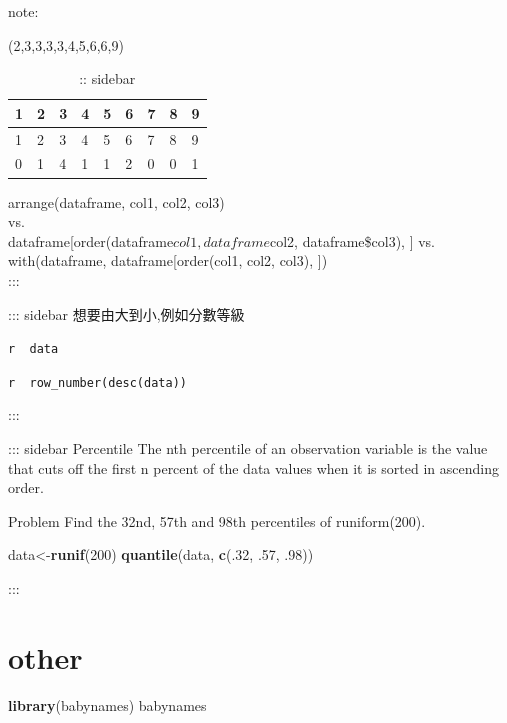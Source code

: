 \documentclass[]{book}
\newenvironment{Shaded}{\begin{snugshade}}{\end{snugshade}}
\newcommand{\KeywordTok}[1]{\textcolor[rgb]{0.13,0.29,0.53}{\textbf{#1}}}
\newcommand{\DecValTok}[1]{\textcolor[rgb]{0.00,0.00,0.81}{#1}}
\newcommand{\NormalTok}[1]{#1}
\theoremstyle{definition}
\theoremstyle{definition}
\theoremstyle{definition}
\theoremstyle{remark}
\begin{document}
note:

(2,3,3,3,3,4,5,6,6,9)

\begin{longtable}[]{@{}lllllllll@{}}
\caption{:: sidebar}\tabularnewline
\toprule
1 & 2 & 3 & 4 & 5 & 6 & 7 & 8 & 9\tabularnewline
\midrule
\endfirsthead
\toprule
1 & 2 & 3 & 4 & 5 & 6 & 7 & 8 & 9\tabularnewline
\midrule
\endhead
0 & 1 & 4 & 1 & 1 & 2 & 0 & 0 & 1\tabularnewline
\bottomrule
\end{longtable}

arrange(dataframe, col1, col2, col3)\\
vs.\\
dataframe{[}order(dataframe\(col1, dataframe\)col2, dataframe\$col3),
{]} vs.\\
with(dataframe, dataframe{[}order(col1, col2, col3), {]})\\
:::

::: sidebar 想要由大到小,例如分數等級

\texttt{r\ \ data}

\texttt{r\ \ row\_number(desc(data))}

:::

::: sidebar Percentile The nth percentile of an observation variable is
the value that cuts off the first n percent of the data values when it
is sorted in ascending order.

Problem Find the 32nd, 57th and 98th percentiles of runiform(200).

\begin{Shaded}
\begin{Highlighting}[]
\NormalTok{data<-}\KeywordTok{runif}\NormalTok{(}\DecValTok{200}\NormalTok{) }
\KeywordTok{quantile}\NormalTok{(data, }\KeywordTok{c}\NormalTok{(.}\DecValTok{32}\NormalTok{, .}\DecValTok{57}\NormalTok{, .}\DecValTok{98}\NormalTok{)) }
\end{Highlighting}
\end{Shaded}

:::

\section{other}\label{other}

\begin{Shaded}
\begin{Highlighting}[]
\KeywordTok{library}\NormalTok{(babynames)}
\NormalTok{babynames}
\end{Highlighting}
\end{Shaded}
\end{document}
